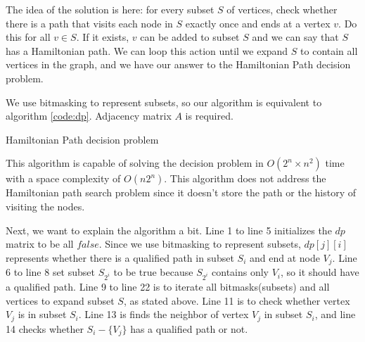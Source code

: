 \begin{solution}

    The idea of the solution is here: for every subset $S$ of vertices, check whether there is a path that visits each node in $S$ exactly once and ends at a vertex $v$. Do this for all $v \in S$. If it exists, $v$ can be added to subset $S$ and we can say that $S$ has a Hamiltonian path. We can loop this action until we expand $S$ to contain all vertices in the graph, and we have our answer to the Hamiltonian Path decision problem. 
    
    We use bitmasking to represent subsets, so our algorithm is equivalent to algorithm \ref{code:dp}. Adjacency matrix $A$ is required.
    
    \begin{algorithm}
    	\caption{Hamiltonian Path decision problem} 
    	\label{code:dp}
        \begin{algorithmic}[1]
        	\ENDFOR
    	\ENDFOR
    	\ENDFOR
    	                    \ENDIF
    	                \ENDIF
    	            \ENDFOR
    	        \ENDIF
    	   \ENDFOR
    	\ENDFOR
            \ENDIF
        \ENDFOR
        \end{algorithmic}
    \end{algorithm}

    This algorithm is capable of solving the decision problem in $O(2^n \times n^2)$ time with a space complexity of $O(n2^n)$. This algorithm does not address the Hamiltonian path search problem since it doesn't store the path or the history of visiting the nodes. 
    
    Next, we want to explain the algorithm a bit. Line 1 to line 5 initializes the $dp$ matrix to be all $false$. Since we use bitmasking to represent subsets, $dp[j][i]$ represents whether there is a qualified path in subset $S_i$ and end at node $V_j$. Line 6 to line 8 set subset $S_{2^i}$ to be true because $S_{2^i}$ contains only $V_i$, so it should have a qualified path. Line 9 to line 22 is to iterate all bitmasks(subsets) and all vertices to expand subset $S$, as stated above. Line 11 is to check whether vertex $V_j$ is in subset $S_i$. Line 13 is finds the neighbor of vertex $V_j$ in subset $S_i$, and line 14 checks whether $S_i - \{V_j\}$ has a qualified path or not. 
    

\end{solution}
